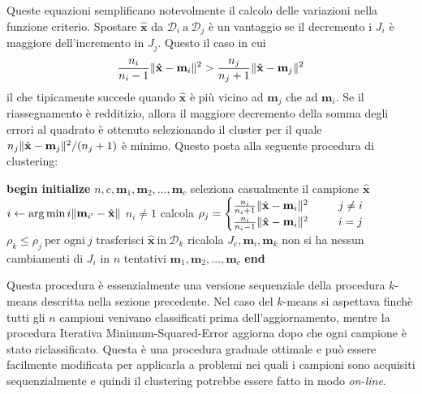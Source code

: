 Queste equazioni semplificano notevolmente il calcolo delle variazioni nella funzione criterio. Spostare $\hat{\mathbf{x}}$ da $\mathcal{D}_i \ \text{a} \ \mathcal{D}_j$ è un vantaggio se il decremento i $J_i$ è maggiore dell'incremento in $J_j$. Questo il caso in cui
\begin{equation}
\frac{n_i}{n_i-1} \lVert\hat{\mathbf{x}} - \mathbf{m}_i\rVert^2 > \frac{n_j}{n_j+1} \lVert\hat{\mathbf{x}} -\mathbf{m}_j \rVert^2
\end{equation}
il che tipicamente succede quando $\hat{\mathbf{x}}$ è più vicino ad $\mathbf{m}_j$ che ad $\mathbf{m}_i$. Se il riassegnamento è redditizio, allora il maggiore decremento della somma degli errori al quadrato è ottenuto selezionando il cluster per il quale $n_j \lVert\hat{\mathbf{x}} - \mathbf{m}_j\rVert^2/(n_j+1)$ è minimo. Questo posta alla seguente procedura di clustering:

\begin{codebox}
\li \textbf{begin initialize} $n, c, \mathbf{m}_1, \mathbf{m}_2, \dots, \mathbf{m}_c$
\li 	\Do seleziona casualmente il campione $\hat{\mathbf{x}}$
\li		$i \gets \arg \min{i} \lVert\mathbf{m}_{i'}- \hat{\mathbf{x}} \rVert$
\li	\If $n_i \neq 1$	
\li 		\Then calcola
\li              
		$\rho_j=
		\begin{cases}
		\frac{n_i}{n_i+1} \lVert\hat{\mathbf{x}} - \mathbf{m}_i\rVert^2 & \ \ \ \ \ j \neq i\\
		\frac{n_i}{n_i-1} \lVert\hat{\mathbf{x}} - \mathbf{m}_i\rVert^2 &  \ \ \ \ \ i = j 
		\end{cases}$ 		
\li		\If $\rho_k \leq \rho_j  \ \text{per ogni} \ j$
\li			\Then trasferisci $\hat{\mathbf{x}} \ \text{in} \ \mathcal{D}_k$
\li				 ricalola $J_e, \mathbf{m}_i, \mathbf{m}_k$
		\End 
\li	\Until non si ha nessun cambiamenti di $J_i$ in $n$ tentativi	
	\li \Return $\mathbf{m}_1, \mathbf{m}_2, \dots, \mathbf{m}_c$	
	\End
	\End
\li \textbf{end}	
\end{codebox}
Questa procedura è essenzialmente una versione sequenziale della procedura $k$-means descritta nella sezione precedente. Nel caso del $k$-means si aspettava finchè tutti gli $n$ campioni venivano classificati prima dell'aggiornamento, mentre la procedura Iterativa Minimum-Squared-Error aggiorna dopo che ogni campione è stato riclassificato. Questa è una procedura graduale ottimale e può essere facilmente modificata per applicarla  a problemi nei quali i campioni sono acquisiti sequenzialmente e quindi il clustering potrebbe essere fatto in modo \emph{on-line}.   

